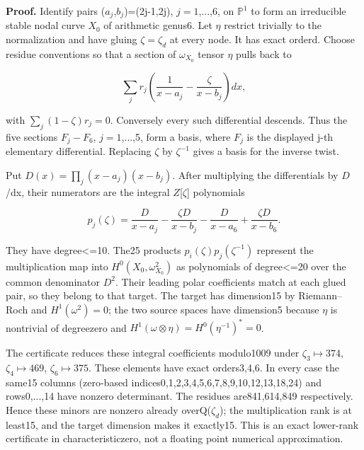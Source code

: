 \textbf{Proof.} Identify pairs (\(a_j\),\(b_j\))=(2j-1,2j), \(j= 1\),...,6, on \(\mathbb P^1\) to form an irreducible stable nodal curve \(X_0\) of arithmetic genus6. Let \(\eta\) restrict trivially to the normalization and have gluing \(\zeta=\zeta_d\) at every node. It has exact orderd. Choose residue conventions so that a section of \(\omega_{X_0}\) tensor \(\eta\) pulls back to

\[
\sum_jr_j\left(\frac1{x-a_j}-\frac{\zeta}{x-b_j}\right)dx,
\]

with \(\sum_j(1-\zeta)r_j=0\). Conversely every such differential descends. Thus the five sections \(F_j-F_6\), \(j= 1\),...,5, form a basis, where \(F_j\) is the displayed j-th elementary differential. Replacing \(\zeta\) by \(\zeta^{-1}\) gives a basis for the inverse twist.

Put \(D(x)=\prod_j(x-a_j)(x-b_j)\). After multiplying the differentials by \(D\)/dx, their numerators are the integral \(Z\)[\(\zeta\)] polynomials

\[
p_j(\zeta)=\frac D{x-a_j}-\frac{\zeta D}{x-b_j}-\frac D{x-a_6}+\frac{\zeta D}{x-b_6}.
\]

They have degree\textless{}=10. The25 products \(p_i(\zeta)p_j(\zeta^{-1})\) represent the multiplication map into \(H^0(X_0,\omega_{X_0}^2)\) as polynomials of degree\textless{}=20 over the common denominator \(D^2\). Their leading polar coefficients match at each glued pair, so they belong to that target. The target has dimension15 by Riemann--Roch and \(H^1(\omega^2)=0\); the two source spaces have dimension5 because \(\eta\) is nontrivial of degreezero and \(H^1(\omega\otimes\eta)=H^0(\eta^{-1})^*=0\).

The certificate reduces these integral coefficients modulo1009 under \(\zeta_3\mapsto374\), \(\zeta_4\mapsto469\), \(\zeta_6\mapsto375\). These elements have exact orders3,4,6. In every case the same15 columns (zero-based indices0,1,2,3,4,5,6,7,8,9,10,12,13,18,24) and rows0,...,14 have nonzero determinant. The residues are841,614,849 respectively. Hence these minors are nonzero already overQ(\(\zeta_d\)); the multiplication rank is at least15, and the target dimension makes it exactly15. This is an exact lower-rank certificate in characteristiczero, not a floating point numerical approximation.

